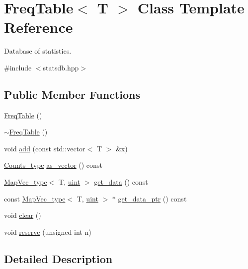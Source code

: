 \hypertarget{class_freq_table}{}\section{Freq\+Table$<$ T $>$ Class Template Reference}
\label{class_freq_table}


Database of statistics.  




{\ttfamily \#include $<$statsdb.\+hpp$>$}

\subsection*{Public Member Functions}
\begin{DoxyCompactItemize}
\item 
\hyperlink{class_freq_table_a2fdea53e35f9a301d7d1bbf6b7da5f41}{Freq\+Table} ()
\item 
\hyperlink{class_freq_table_a7ed627807a61c484243636137609abcd}{$\sim$\+Freq\+Table} ()
\item 
void \hyperlink{class_freq_table_a919e08556ba3aa9535a64827315bb89a}{add} (const std\+::vector$<$ T $>$ \&x)
\item 
\hyperlink{typedefs_8hpp_aee40fa17c1fddb63dd1f2b1470ade95b}{Counts\+\_\+type} \hyperlink{class_freq_table_a1898e62605d8753e170189936d403e05}{as\+\_\+vector} () const
\item 
\hyperlink{typedefs_8hpp_a02ed8dec96bc528c8bc3d8cb3c4674a5}{Map\+Vec\+\_\+type}$<$ T, \hyperlink{typedefs_8hpp_a91ad9478d81a7aaf2593e8d9c3d06a14}{uint} $>$ \hyperlink{class_freq_table_a7b99496d1c2f4193654752856b30d1a5}{get\+\_\+data} () const
\item 
const \hyperlink{typedefs_8hpp_a02ed8dec96bc528c8bc3d8cb3c4674a5}{Map\+Vec\+\_\+type}$<$ T, \hyperlink{typedefs_8hpp_a91ad9478d81a7aaf2593e8d9c3d06a14}{uint} $>$ $\ast$ \hyperlink{class_freq_table_ab5dd6677f52072c93d18b2b9a3369ae7}{get\+\_\+data\+\_\+ptr} () const
\item 
void \hyperlink{class_freq_table_a326660096e4309780aea8355d0f74ac7}{clear} ()
\item 
void \hyperlink{class_freq_table_a0bdced25f7c0bee38e073c4654578d19}{reserve} (unsigned int n)
\end{DoxyCompactItemize}


\subsection{Detailed Description}
